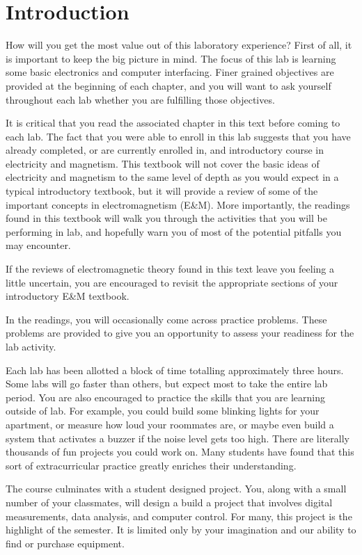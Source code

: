 \chapter{Introduction}

How will you get the most value out of this laboratory experience? First of all,
it is important to keep the big picture in mind. The focus of this lab is 
learning some basic electronics and computer interfacing. Finer grained
objectives are provided at the beginning of each chapter, and you will want to
ask yourself throughout each lab whether you are fulfilling those objectives.

It is critical that you read the associated chapter in this text before coming
to each lab. The fact that you were able to enroll in this lab suggests that 
you have already completed, or are currently enrolled in, and introductory
course in electricity and magnetism. This textbook will not cover the basic
ideas of electricity and magnetism to the same level of depth as you would
expect in a typical introductory textbook, but it will provide a review of
some of the important concepts in electromagnetism (E\&M). More importantly, the
readings found in this textbook will walk you through the activities that you
will be performing in lab, and hopefully warn you of most of the potential 
pitfalls you may encounter. 

If the reviews of electromagnetic theory found in this text leave you feeling
a little uncertain, you are encouraged to revisit the appropriate sections of
your introductory E\&M textbook.

In the readings, you will occasionally come across practice problems. These 
problems are provided to give you an opportunity to assess your readiness for
the lab activity.

Each lab has been allotted a block of time totalling approximately three hours.
Some labs will go faster than others, but expect most to take the entire lab 
period. You are also encouraged to practice the skills that you are learning
outside of lab. For example, you could build some blinking lights for your 
apartment, or measure how loud your roommates are, or maybe even build a system
that activates a buzzer if the noise level gets too high. There are literally
thousands of fun projects you could work on. Many students have
found that this sort of extracurricular practice greatly enriches their 
understanding.

The course culminates with a student designed project. You, along with a small
number of your classmates, will design a build a project that involves digital
measurements, data analysis, and computer control. For many, this project is
the highlight of the semester. It is limited only by your imagination and our
ability to find or purchase equipment.

